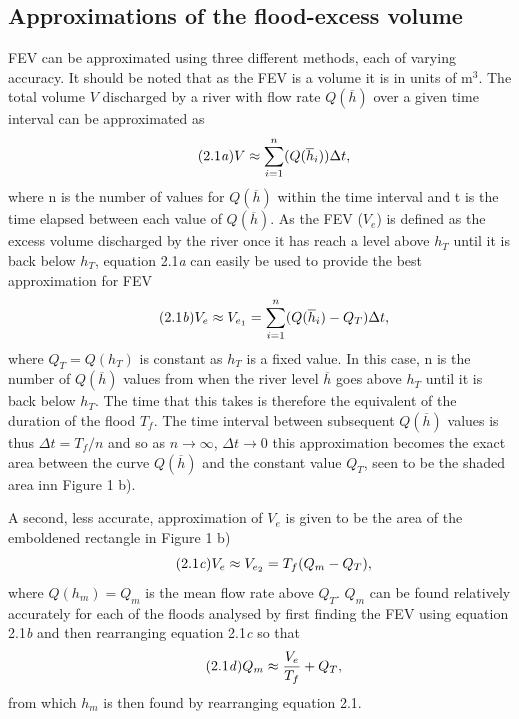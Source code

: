 \documentclass[11pt,a4paper]{article}
\begin{document}
\subsection{Approximations of the flood-excess volume}
FEV can be approximated using three different methods, each of varying accuracy. It should be noted that as the FEV is a volume it is in units of m$^3$. The total volume $V$ discharged by a river with flow rate $Q(\overline{h})$ over a given time interval can be approximated as
\begin{equation}\tag{2.1\textit{a}}
V\approx \sum_{i=1}^{n}(Q(\overline{h}_i))\Delta t,
\end{equation}
where n is the number of values for $Q(\overline{h})$ within the time interval and t is the time elapsed between each value of $Q(\overline{h})$. As the FEV ($V_e$) is defined as the excess volume discharged by the river once it has reach a level above $h_T$ until it is back below $h_T$, equation 2.1\textit{a} can easily be used to provide the best approximation for FEV
\begin{equation}\tag{2.1\textit{b}}
V_e\approx V_{e_1} = \sum_{i=1}^{n}(Q(\overline{h}_i)-Q_T)\Delta t,
\end{equation}
where $Q_T=Q(h_T)$ is constant as $h_T$ is a fixed value. In this case, n is the number of $Q(\overline{h})$ values from when the river level $\overline{h}$ goes above $h_T$ until it is back below $h_T$. The time that this takes is therefore the equivalent of the duration of the flood $T_f$. The time interval between subsequent $Q(\overline{h})$ values is thus $\Delta t=T_f/n$ and so as $n \to \infty$, $\Delta t \to 0$ this approximation becomes the exact area between the curve $Q(\overline{h})$ and the constant value $Q_T$, seen to be the shaded area inn Figure 1 b).

A second, less accurate, approximation of $V_e$ is given to be the area of the emboldened rectangle in Figure 1 b)
\begin{equation}\tag{2.1\textit{c}}
V_e \approx V_{e_2} = T_f(Q_m-Q_T),
\end{equation}
where $Q(h_m)=Q_m$ is the mean flow rate above $Q_T$. $Q_m$ can be found relatively accurately for each of the floods analysed by first finding the FEV using equation 2.1\textit{b} and then rearranging equation 2.1\textit{c} so that
\begin{equation}\tag{2.1\textit{d}}
Q_m\approx \frac{V_e}{T_f}+Q_T,
\end{equation}
from which $h_m$ is then found by rearranging equation 2.1.
\end{document}
